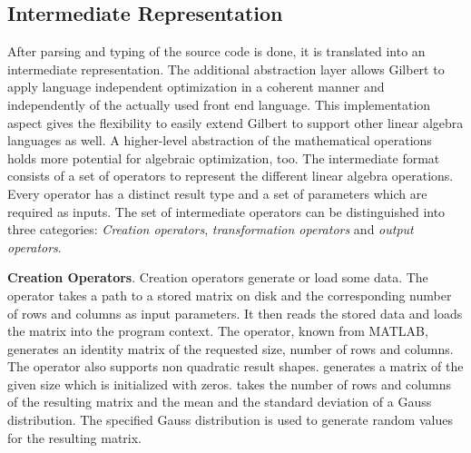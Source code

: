 \subsection{Intermediate Representation}
\label{sec:intermediaterepresentation}

After parsing and typing of the source code is done, it is translated into an intermediate representation. The additional abstraction layer allows Gilbert to apply language independent optimization in a coherent manner and independently of the actually used front end language. This implementation aspect gives the flexibility to easily extend Gilbert to support other linear algebra languages as well. A higher-level abstraction of the mathematical operations holds more potential for algebraic optimization, too. The intermediate format consists of a set of operators to represent the different linear algebra operations. Every operator has a distinct result type and a set of parameters which are required as inputs. The set of intermediate operators can be distinguished into three categories: \emph{Creation operators}, \emph{transformation operators} and \emph{output operators}.


\textbf{Creation Operators}. Creation operators generate or load some data.
The  operator takes a path to a stored matrix on disk and the corresponding number of rows and columns as input parameters.
It then reads the stored data and loads the matrix into the program context.
The  operator, known from MATLAB, generates an identity matrix of the requested size, number of rows and columns.
The operator also supports non quadratic result shapes.
 generates a matrix of the given size which is initialized with zeros.
 takes the number of rows and columns of the resulting matrix and the mean and the standard deviation of a Gauss distribution.
The specified Gauss distribution is used to generate random values for the resulting matrix.


